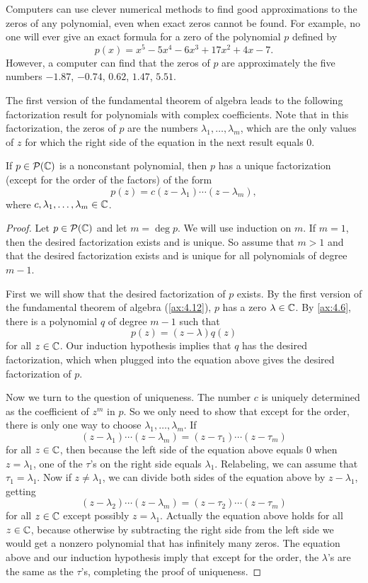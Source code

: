 Computers can use clever numerical methods to find good approximations to the
zeros of any polynomial, even when exact zeros cannot be found. For example, no
one will ever give an exact formula for a zero of the polynomial $p$ defined by
\[ p(x) = x^5-5x^4-6x^3+17x^2+4x-7. \]
However, a computer can find that the zeros of $p$ are approximately the five
numbers $-1.87$, $-0.74$, $0.62$, $1.47$, $5.51$.

The first version of the fundamental theorem of algebra leads to the following
factorization result for polynomials with complex coefficients. Note that in
this factorization, the zeros of $p$ are the numbers $\lambda_1,\dots,\lambda_m$,
which are the only values of $z$ for which the right side of the equation in the
next result equals $0$.

\begin{result}\label{ax:4.13}
If $p\in\mathcal{P}(\mathbb{C})$ is a nonconstant polynomial, then $p$ has a unique
factorization (except for the order of the factors) of the form
\[ p(z) = c(z-\lambda_1)\cdots(z-\lambda_m), \]
where $c,\lambda_1,\dots,\lambda_m\in\mathbb{C}$.
\end{result}

\begin{proof}
Let $p\in\mathcal{P}(\mathbb{C})$ and let $m=\deg p$. We will use induction on $m$. If
$m=1$, then the desired factorization exists and is unique. So assume that
$m>1$ and that the desired factorization exists and is unique for all
polynomials of degree $m-1$.

First we will show that the desired factorization of $p$ exists. By the first
version of the fundamental theorem of algebra (\ref{ax:4.12}), $p$ has a zero
$\lambda\in\mathbb{C}$. By \ref{ax:4.6}, there is a polynomial $q$ of degree $m-1$ such
that
\[ p(z) = (z-\lambda)q(z) \]
for all $z\in\mathbb{C}$. Our induction hypothesis implies that $q$ has the desired
factorization, which when plugged into the equation above gives the desired
factorization of $p$.

Now we turn to the question of uniqueness. The number $c$ is uniquely
determined as the coefficient of $z^m$ in $p$. So we only need to show that
except for the order, there is only one way to choose
$\lambda_1,\dots,\lambda_m$. If
\[ (z-\lambda_1)\cdots(z-\lambda_m) = (z-\tau_1)\cdots(z-\tau_m) \]
for all $z\in\mathbb{C}$, then because the left side of the equation above equals $0$
when $z=\lambda_1$, one of the $\tau$'s on the right side equals $\lambda_1$.
Relabeling, we can assume that $\tau_1=\lambda_1$. Now if $z\ne\lambda_1$, we
can divide both sides of the equation above by $z-\lambda_1$, getting
\[ (z-\lambda_2)\cdots(z-\lambda_m) = (z-\tau_2)\cdots(z-\tau_m) \]
for all $z\in\mathbb{C}$ except possibly $z=\lambda_1$. Actually the equation above
holds for all $z\in\mathbb{C}$, because otherwise by subtracting the right side from
the left side we would get a nonzero polynomial that has infinitely many zeros.
The equation above and our induction hypothesis imply that except for the
order, the $\lambda$'s are the same as the $\tau$'s, completing the proof of
uniqueness.
\end{proof}

